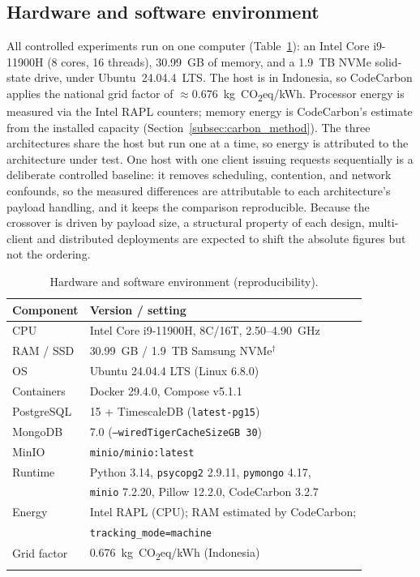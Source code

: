 \documentclass[pdflatex,sn-basic]{sn-jnl}%
\begin{document}
\subsection{Hardware and software environment}\label{subsec:env}
All controlled experiments run on one computer (Table~\ref{tab:env}): an Intel Core i9-11900H (8 cores, 16 threads), 30.99~GB of memory, and a 1.9~TB NVMe solid-state drive, under Ubuntu~24.04.4~LTS. The host is in Indonesia, so CodeCarbon applies the national grid factor of $\approx$0.676~kg~CO\textsubscript{2}eq/kWh. Processor energy is measured via the Intel RAPL counters; memory energy is CodeCarbon's estimate from the installed capacity (Section~\ref{subsec:carbon_method}). The three architectures share the host but run one at a time, so energy is attributed to the architecture under test. One host with one client issuing requests sequentially is a deliberate controlled baseline: it removes scheduling, contention, and network confounds, so the measured differences are attributable to each architecture's payload handling, and it keeps the comparison reproducible. Because the crossover is driven by payload size, a structural property of each design, multi-client and distributed deployments are expected to shift the absolute figures but not the ordering.

\begin{table}[htbp]
\caption{Hardware and software environment (reproducibility).}\label{tab:env}
\small
\begin{tabular}{@{}ll@{}}
\toprule
Component & Version / setting \\
\midrule
CPU & Intel Core i9-11900H, 8C/16T, 2.50--4.90~GHz \\
RAM / SSD & 30.99~GB / 1.9~TB Samsung NVMe$^{\dagger}$ \\
OS & Ubuntu 24.04.4 LTS (Linux 6.8.0) \\
Containers & Docker 29.4.0, Compose v5.1.1 \\
PostgreSQL & 15 + TimescaleDB (\texttt{latest-pg15}) \\
MongoDB & 7.0 (\texttt{--wiredTigerCacheSizeGB 30}) \\
MinIO & \texttt{minio/minio:latest} \\
Runtime & Python 3.14, \texttt{psycopg2} 2.9.11, \texttt{pymongo} 4.17, \\
        & \texttt{minio} 7.2.20, Pillow 12.2.0, CodeCarbon 3.2.7 \\
Energy & Intel RAPL (CPU); RAM estimated by CodeCarbon; \\
       & \texttt{tracking\_mode=machine} \\
Grid factor & 0.676~kg~CO\textsubscript{2}eq/kWh (Indonesia) \\
\botrule
\end{tabular}
\end{table}
\end{document}
